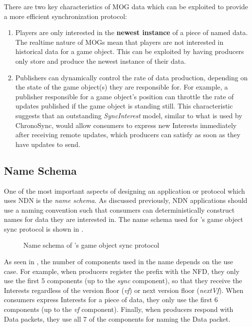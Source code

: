 There are two key characteristics of MOG data which can be exploited to provide a more efficient synchronization protocol:
\begin{enumerate}
    \item Players are only interested in the \textbf{newest instance} of a piece of named data. The realtime nature of MOGs mean that players are not interested in historical data for a game object. This can be exploited by having producers only store and produce the newest instance of their data.
    \item Publishers can dynamically control the rate of data production, depending on the state of the game object(s) they are responsible for. For example, a publisher responsible for a game object's position can throttle the rate of updates published if the game object is standing still. This characteristic suggests that an outstanding \textit{SyncInterest} model, similar to what is used by ChronoSync, would allow consumers to express new Interests immediately after receiving remote updates, which producers can satisfy as soon as they have updates to send.
\end{enumerate}

\subsection{Name Schema}\label{sec:des:naming}
One of the most important aspects of designing an application or protocol which uses NDN is the \textit{name schema}. As discussed previously, NDN applications should use a naming convention such that consumers can deterministically construct names for data they are interested in. The name schema used for \game{}'s game object sync protocol is shown in .

\begin{figure}[H]
    \centering
    \caption{Name schema of \game{}'s game object sync protocol}
    \label{fig:des:sync-protocol-name}
\end{figure}

As seen in , the number of components used in the name depends on the use case. For example, when producers register the prefix with the NFD, they only use the first 5 components (up to the \textit{sync} component), so that they receive the Interests regardless of the version floor (\textit{vf}) or next version floor (\textit{nextVf}). When consumers express Interests for a piece of data, they only use the first 6 components (up to the \textit{vf} component). Finally, when producers respond with Data packets, they use all 7 of the components for naming the Data packet.

